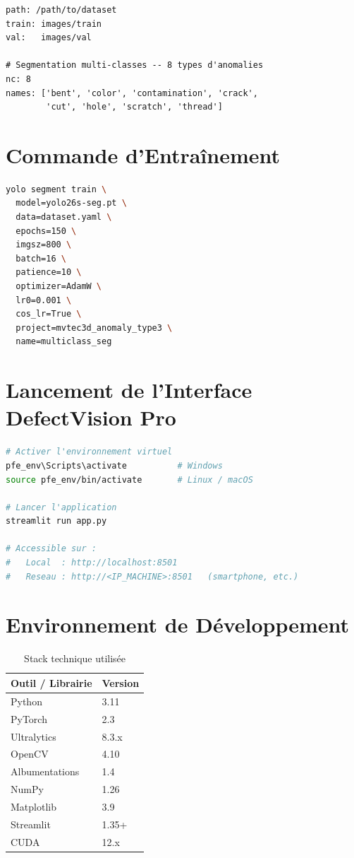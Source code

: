 \documentclass[12pt, a4paper]{report}
\begin{document}
\begin{lstlisting}[caption=Fichier de configuration dataset.yaml pour YOLO26s-seg multi-classes]
path: /path/to/dataset
train: images/train
val:   images/val

# Segmentation multi-classes -- 8 types d'anomalies
nc: 8
names: ['bent', 'color', 'contamination', 'crack',
        'cut', 'hole', 'scratch', 'thread']
\end{lstlisting}

\chapter{Commande d'Entraînement}

\begin{lstlisting}[language=bash, caption=Lancement de l'entraînement YOLO26s-seg]
yolo segment train \
  model=yolo26s-seg.pt \
  data=dataset.yaml \
  epochs=150 \
  imgsz=800 \
  batch=16 \
  patience=10 \
  optimizer=AdamW \
  lr0=0.001 \
  cos_lr=True \
  project=mvtec3d_anomaly_type3 \
  name=multiclass_seg
\end{lstlisting}

\chapter{Lancement de l'Interface DefectVision Pro}

\begin{lstlisting}[language=bash, caption=Démarrage de l'application Streamlit]
# Activer l'environnement virtuel
pfe_env\Scripts\activate          # Windows
source pfe_env/bin/activate       # Linux / macOS

# Lancer l'application
streamlit run app.py

# Accessible sur :
#   Local  : http://localhost:8501
#   Reseau : http://<IP_MACHINE>:8501   (smartphone, etc.)
\end{lstlisting}

\chapter{Environnement de Développement}

\begin{table}[H]
  \centering
  \caption{Stack technique utilisée}
  \begin{tabular}{ll}
    \toprule
    \rowcolor{themebluevlight}
    \textbf{Outil / Librairie} & \textbf{Version} \\
    \midrule
    Python           & 3.11  \\
    PyTorch          & 2.3   \\
    Ultralytics      & 8.3.x \\
    OpenCV           & 4.10  \\
    Albumentations   & 1.4   \\
    NumPy            & 1.26  \\
    Matplotlib       & 3.9   \\
    Streamlit        & 1.35+ \\
    CUDA             & 12.x  \\
    \bottomrule
  \end{tabular}
\end{table}
\end{document}
